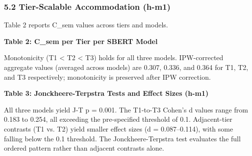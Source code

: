\subsubsection{5.2 Tier-Scalable Accommodation (h-m1)}

Table 2 reports C\_sem values across tiers and models.

\textbf{Table 2: C\_sem per Tier per SBERT Model}

\begin{table}[htbp]
\centering
{}
\end{table}

Monotonicity (T1 < T2 < T3) holds for all three models. IPW-corrected aggregate values (averaged across models) are 0.307, 0.336, and 0.364 for T1, T2, and T3 respectively; monotonicity is preserved after IPW correction.

\textbf{Table 3: Jonckheere-Terpstra Tests and Effect Sizes (h-m1)}

\begin{table}[htbp]
\centering
{}
\end{table}

All three models yield J-T p = 0.001. The T1-to-T3 Cohen's d values range from 0.183 to 0.254, all exceeding the pre-specified threshold of 0.1. Adjacent-tier contrasts (T1 vs. T2) yield smaller effect sizes (d = 0.087--0.114), with some falling below the 0.1 threshold. The Jonckheere-Terpstra test evaluates the full ordered pattern rather than adjacent contrasts alone.

